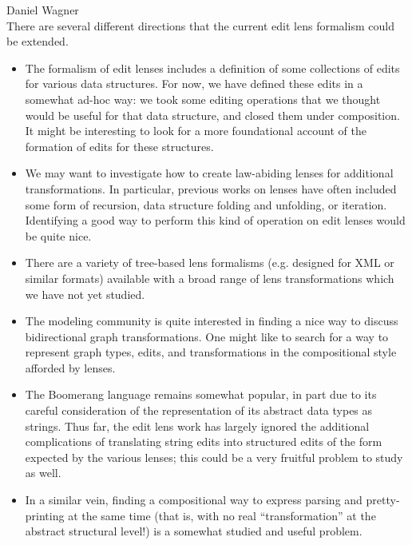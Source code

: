 \documentclass{article}
\begin{document}
{\noindent\large Daniel Wagner}\\[3ex]

There are several different directions that the current edit lens formalism
could be extended.

\begin{itemize}
    \item The formalism of edit lenses includes a definition of some
        collections of edits for various data structures. For now, we have
        defined these edits in a somewhat ad-hoc way: we took some editing
        operations that we thought would be useful for that data structure,
        and closed them under composition. It might be interesting to look
        for a more foundational account of the formation of edits for these
        structures.
    \item We may want to investigate how to create law-abiding lenses for
        additional transformations. In particular, previous works on lenses
        have often included some form of recursion, data structure folding
        and unfolding, or iteration. Identifying a good way to perform this
        kind of operation on edit lenses would be quite nice.
    \item There are a variety of tree-based lens formalisms (e.g. designed
        for XML or similar formats) available with a broad range of lens
        transformations which we have not yet studied.
    \item The modeling community is quite interested in finding a nice way
        to discuss bidirectional graph transformations. One might like to
        search for a way to represent graph types, edits, and
        transformations in the compositional style afforded by lenses.
    \item The Boomerang language remains somewhat popular, in part due to
        its careful consideration of the representation of its abstract data
        types as strings. Thus far, the edit lens work has largely ignored
        the additional complications of translating string edits into
        structured edits of the form expected by the various lenses; this
        could be a very fruitful problem to study as well.
    \item In a similar vein, finding a compositional way to express parsing
        and pretty-printing at the same time (that is, with no real
        ``transformation'' at the abstract structural level!) is a somewhat
        studied and useful problem.
\end{itemize}
\end{document}
